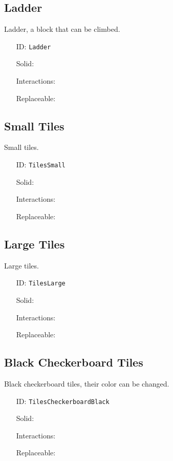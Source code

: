 \subsection{Ladder}\label{subsec:blocks_ladder}
Ladder, a block that can be climbed.
\newline
\begin{itemize}[nosep]
    \item[ID:] \texttt{Ladder}
    \item[Solid:]  \XSolidBrush \item[Interactions:]  \XSolidBrush \item[Replaceable:]  \XSolidBrush
\end{itemize}

\subsection{Small Tiles}\label{subsec:blocks_small tiles}
Small tiles.
\newline
\begin{itemize}[nosep]
    \item[ID:] \texttt{TilesSmall}
    \item[Solid:]  \Checkmark \item[Interactions:]  \XSolidBrush \item[Replaceable:]  \XSolidBrush
\end{itemize}

\subsection{Large Tiles}\label{subsec:blocks_large tiles}
Large tiles.
\newline
\begin{itemize}[nosep]
    \item[ID:] \texttt{TilesLarge}
    \item[Solid:]  \Checkmark \item[Interactions:]  \XSolidBrush \item[Replaceable:]  \XSolidBrush
\end{itemize}

\subsection{Black Checkerboard Tiles}\label{subsec:blocks_black checkerboard tiles}
Black checkerboard tiles, their color can be changed.
\newline
\begin{itemize}[nosep]
    \item[ID:] \texttt{TilesCheckerboardBlack}
    \item[Solid:]  \Checkmark \item[Interactions:]  \Checkmark \item[Replaceable:]  \XSolidBrush
\end{itemize}

